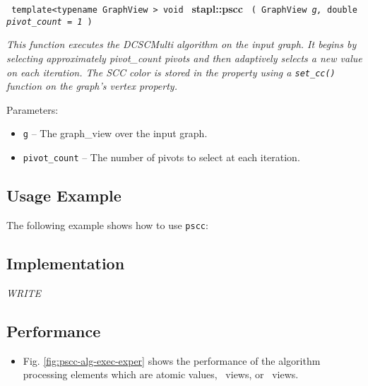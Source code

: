 \noindent
\texttt{%
template<typename GraphView >
\newline
void 
}
\newline
\textbf{stapl::pscc}%
\newline
\texttt{%
(
GraphView
\textit{g,}%
double
\textit{pivot\_count = 1}%
)     
}
\vspace{0.4cm}

\textit{
This function executes the DCSCMulti algorithm on the input graph. It begins by selecting approximately pivot\_count pivots and then adaptively selects a new value on each iteration. The SCC color is stored in the property using a 
\texttt{set\_cc()} function on the graph's vertex property.
}
\vspace{0.4cm}

Parameters:
\begin{itemize}
\item
\texttt{g} --
The graph\_view over the input graph.
\item
\texttt{pivot\_count} --
The number of pivots to select at each iteration.
\end{itemize}

\subsection{Usage Example} \label{sec-pscc-alg-use}

The following example shows how to use 
\texttt{pscc}:


\subsection{Implementation} \label{sec-pscc-alg-impl}

\textit{WRITE}

\subsection{Performance} \label{sec-pscc-alg-perf}

\begin{itemize}
\item
Fig. \ref{fig:pscc-alg-exec-exper}
shows the performance of the algorithm processing
elements which are atomic values, \stl\ views, or \stapl\ views.
\end{itemize}

